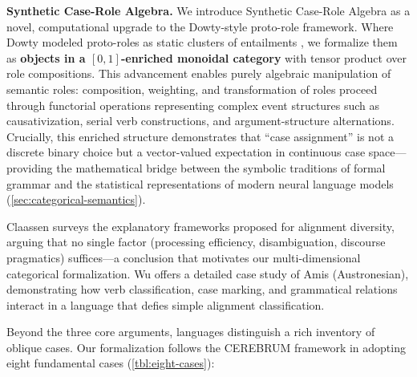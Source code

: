 \documentclass[
]{article}
\begin{document}
\textbf{Synthetic Case-Role Algebra.} We introduce Synthetic Case-Role
Algebra as a novel, computational upgrade to the Dowty-style proto-role
framework. Where Dowty modeled proto-roles as static clusters of
entailments \citeyearpar{dowty1991thematic}, we formalize them as
\textbf{objects in a \([0,1]\)-enriched monoidal category} with tensor
product over role compositions. This advancement enables purely
algebraic manipulation of semantic roles: composition, weighting, and
transformation of roles proceed through functorial operations
representing complex event structures such as causativization, serial
verb constructions, and argument-structure alternations. Crucially, this
enriched structure demonstrates that ``case assignment'' is not a
discrete binary choice but a vector-valued expectation in continuous
case space---providing the mathematical bridge between the symbolic
traditions of formal grammar and the statistical representations of
modern neural language models (\autoref{sec:categorical-semantics}).

Claassen \citeyearpar{claassen2019alignment} surveys the explanatory
frameworks proposed for alignment diversity, arguing that no single
factor (processing efficiency, disambiguation, discourse pragmatics)
suffices---a conclusion that motivates our multi-dimensional categorical
formalization. Wu \citeyearpar{wu2024amis} offers a detailed case study
of Amis (Austronesian), demonstrating how verb classification, case
marking, and grammatical relations interact in a language that defies
simple alignment classification.

Beyond the three core arguments, languages distinguish a rich inventory
of oblique cases. Our formalization follows the CEREBRUM framework
\citep{friedman2024cerebrum} in adopting eight fundamental cases
(\autoref{tbl:eight-cases}):
\end{document}
